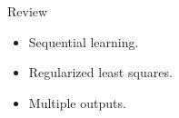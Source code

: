
  \begin{frame}{Review}
    \begin{itemize}
      \item Sequential learning.
      \item Regularized least squares.
      \item Multiple outputs.
    \end{itemize} 
  \end{frame}
  